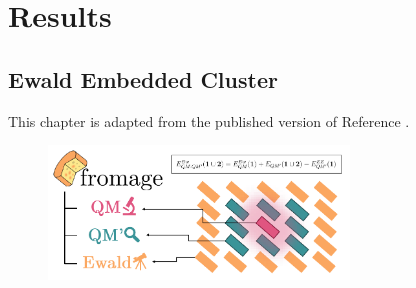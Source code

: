 \part{Results}
\chapter{Ewald Embedded Cluster}
\label{chap:jctc}
This chapter is adapted from the published version of Reference .

\begin{figure}[h]
\centering
\includegraphics[width=8cm]{Chapters/5Ewald/TOC.pdf}

\label{fig:toc_jctc}
\end{figure}




